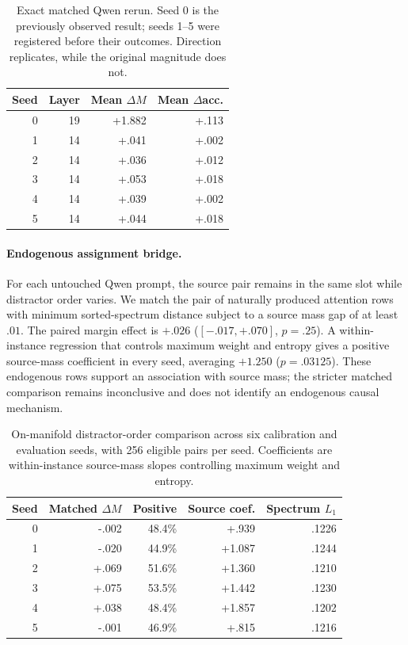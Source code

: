 \documentclass[letterpaper]{article} %
\begin{document}
\begin{table}[t]
\centering
\small
\setlength{\tabcolsep}{3.5pt}
\begin{tabular}{rrrr}
\toprule
Seed & Layer & Mean $\Delta M$ & Mean $\Delta$acc. \\
\midrule
0 & 19 & +1.882 & +.113 \\
1 & 14 & +.041 & +.002 \\
2 & 14 & +.036 & +.012 \\
3 & 14 & +.053 & +.018 \\
4 & 14 & +.039 & +.002 \\
5 & 14 & +.044 & +.018 \\
\bottomrule
\end{tabular}
\caption{Exact matched Qwen rerun. Seed 0 is the previously observed result; seeds 1--5 were registered before
their outcomes. Direction replicates, while the original magnitude does not.}
\label{tab:supp-qwen-exact}
\end{table}

\paragraph{Endogenous assignment bridge.}
For each untouched Qwen prompt, the source pair remains in the same slot while distractor order varies. We
match the pair of naturally produced attention rows with minimum sorted-spectrum distance subject to a source
mass gap of at least $.01$. The paired margin effect is $+.026$ ($[-.017,+.070]$, $p=.25$). A within-instance
regression that controls maximum weight and entropy gives a positive source-mass coefficient in every seed,
averaging $+1.250$ ($p=.03125$). These endogenous rows support an association with source mass;
the stricter matched comparison remains inconclusive and does not identify an endogenous causal mechanism.

\begin{table}[t]
\centering
\scriptsize
\setlength{\tabcolsep}{2.5pt}
\begin{tabular}{rrrrr}
\toprule
Seed & Matched $\Delta M$ & Positive & Source coef. & Spectrum $L_1$ \\
\midrule
0 & -.002 & 48.4\% & +.939 & .1226 \\
1 & -.020 & 44.9\% & +1.087 & .1244 \\
2 & +.069 & 51.6\% & +1.360 & .1210 \\
3 & +.075 & 53.5\% & +1.442 & .1230 \\
4 & +.038 & 48.4\% & +1.857 & .1202 \\
5 & -.001 & 46.9\% & +.815 & .1216 \\
\bottomrule
\end{tabular}
\caption{On-manifold distractor-order comparison across six calibration and evaluation seeds, with 256
eligible pairs per seed. Coefficients are within-instance source-mass slopes controlling maximum weight and entropy.}
\label{tab:supp-endogenous}
\end{table}
\end{document}
